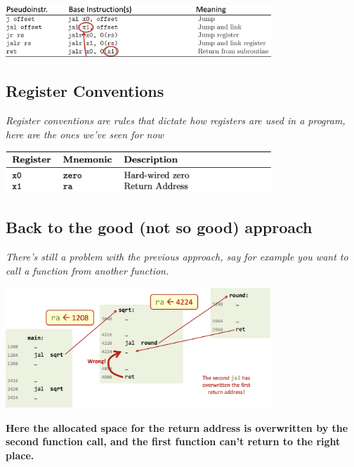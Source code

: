 \begin{center}
    \includegraphics[width=0.75\textwidth]{chapters/chapter1b/images/jump.png}
\end{center}
\newpage
\subsection{Register Conventions}
\textit{Register conventions are rules that dictate how registers are used in a program, here are the ones we've seen for now} \\
\begin{center}
    \includegraphics[width=0.75\textwidth]{chapters/chapter1b/images/conventions.png}
\end{center}

\subsection{Back to the good (not so good) approach}
\textit{There's still a problem with the previous approach, say for example you want to call a function from another function.}
\begin{center}
    \includegraphics[width=0.75\textwidth]{chapters/chapter1b/images/function2.png}
\end{center}
\textbf{Here the allocated space for the return address is overwritten by the second function call, and the first function can't return to the right place.}
